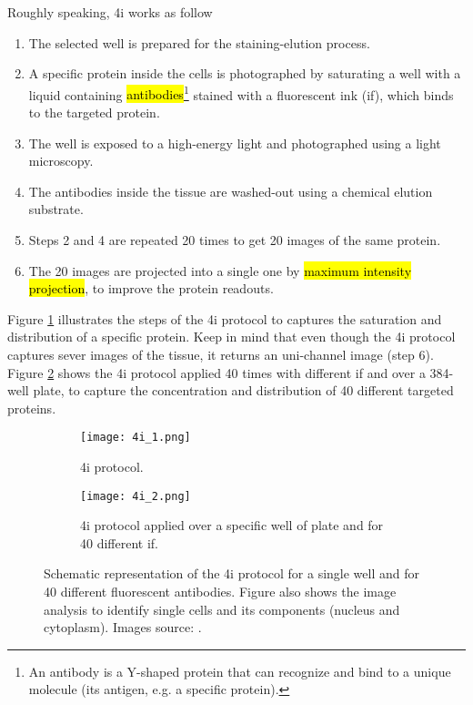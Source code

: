 Roughly speaking, \gls{4i} works as follow
\begin{enumerate}
  \item The selected well is prepared for the staining-elution process.
  \item A specific protein inside the cells is photographed by saturating a well with a liquid containing \hl{antibodies}\footnote{An antibody is a Y-shaped protein that can recognize and bind to a unique molecule (its antigen, e.g. a specific protein).} stained with a fluorescent ink (\gls{if}), which binds to the targeted protein.
  \item The well is exposed to a high-energy light and photographed using a light microscopy.
  \item The antibodies inside the tissue are washed-out using a chemical elution substrate.
  \item Steps 2 and 4 are repeated 20 times to get 20 images of the same protein.
  \item The 20 images are projected into a single one by \hl{maximum intensity projection}, to improve the protein readouts.
\end{enumerate}

Figure \ref{fig:4i:1} illustrates the steps of the \gls{4i} protocol to captures the saturation and distribution of a specific protein. Keep in mind that even though the \gls{4i} protocol captures sever images of the tissue, it returns an uni-channel image (step 6). Figure \ref{fig:4i:2} shows the \gls{4i} protocol applied 40 times with different \gls{if} and over a 384-well plate, to capture the concentration and distribution of 40 different targeted proteins.

\begin{figure}[htb]
  \centering
  \begin{subfigure}[t]{.3\linewidth}
    \texttt{[image: 4i\_1.png]}
    \caption{\Acrfull{4i} protocol.}
    \label{fig:4i:1}
  \end{subfigure}
  \hspace{4mm}
  \begin{subfigure}[t]{.45\linewidth}
    \texttt{[image: 4i\_2.png]}
    \caption{\gls{4i} protocol applied over a specific well of plate and for 40 different \gls{if}.}
    \label{fig:4i:2}
  \end{subfigure}%
  \caption{Schematic representation of the \gls{4i} protocol for a single well and for 40 different fluorescent antibodies. Figure  also shows the image analysis to identify single cells and its components (nucleus and cytoplasm). Images source: \cite{Guteaar7042}.}
  \label{fig:4i}
\end{figure}

